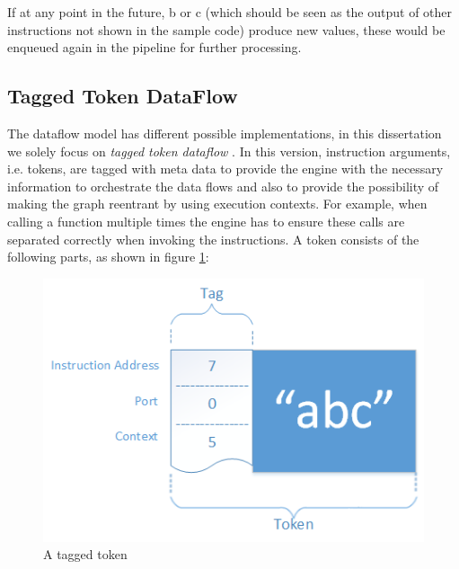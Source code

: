 If at any point in the future, b or c (which should be seen as the output of other instructions not shown in the sample code) produce new values, these would be enqueued again in the pipeline for further processing.

\subsection{Tagged Token DataFlow}
\label{sec:tagged-token-dataflow}

The dataflow model has different possible implementations, in this dissertation we solely focus on \textit{tagged token dataflow} \citep{arvind_executing_1990}.
In this version, instruction arguments, i.e. tokens, are tagged with meta data to provide the engine with the necessary information to orchestrate the data flows and also to provide the possibility of making the graph reentrant by using execution contexts. For example, when calling a function multiple times the engine has to ensure these calls are separated correctly when invoking the instructions. A token consists of the following parts, as shown in figure \ref{fig:background-dataflow-token}:

\begin{figure}[ht]
	\centerline{\includegraphics[width=\textwidth]{images/background-dataflow-token.png}}
	\caption{A tagged token}
	\label{fig:background-dataflow-token}
\end{figure}

